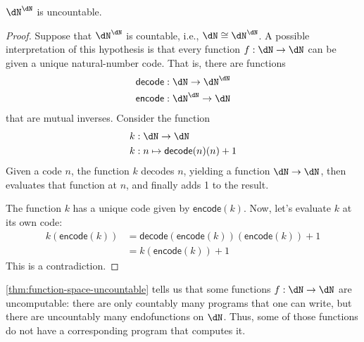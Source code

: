 \documentclass{amsart}
\begin{document}
\begin{thm}\label{thm:function-space-uncountable}
  $\dN^{\dN}$ is uncountable.
\end{thm}
\begin{proof}
  Suppose that $\dN^{\dN}$ is countable, i.e., $\dN \iso \dN^{\dN}$.
  A possible interpretation of this hypothesis is that every function $f : \dN \to \dN$ can be given a unique natural-number code.
  That is, there are functions
  \begin{align}
    \mathsf{decode} &: \dN \to \dN^{\dN}\\
    \mathsf{encode} &: \dN^{\dN} \to \dN
  \end{align}
  that are mutual inverses.
  Consider the function
  \begin{align}
    k &: \dN \to \dN\\
    k &: n \mapsto \mathsf{decode}(n)(n) + 1
  \end{align}
  Given a code $n$, the function $k$ decodes $n$, yielding a function $\dN \to \dN$, then evaluates that function at $n$, and finally adds 1 to the result.

  The function $k$ has a unique code given by $\mathsf{encode}(k)$.
  Now, let's evaluate $k$ at its own code:
  \begin{align}
    k(\mathsf{encode}(k)) &= \mathsf{decode}(\mathsf{encode}(k))(\mathsf{encode}(k)) + 1\\
                          &= k(\mathsf{encode}(k)) + 1
  \end{align}
  This is a contradiction.
\end{proof}

\cref{thm:function-space-uncountable} tells us that some functions $f : \dN \to \dN$ are uncomputable: there are only countably many programs that one can write, but there are uncountably many endofunctions on $\dN$. Thus, some of those functions do not have a corresponding program that computes it.
\end{document}
